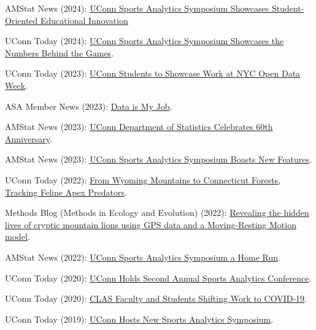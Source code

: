 \documentclass[Statistics]{vita}
\begin{document}
\begin{vita}
\begin{Services}
  \begin{Media}
  \item AMStat News (2024): \href{https://magazine.amstat.org/blog/2024/11/05/uconn-ucsas-2024/}{UConn Sports Analytics Symposium Showcases Student-Oriented Educational Innovation}
  \item UConn Today (2024): \href{https://today.uconn.edu/2024/04/uconn-sports-analytics-symposium-returns-for-fifth-time/}{UConn Sports Analytics Symposium Showcases the Numbers Behind the Games}.
  \item UConn Today (2023): \href{https://today.uconn.edu/2023/03/uconn-students-to-showcase-work-at-nyc-open-data-week/}{UConn Students to Showcase Work at NYC Open Data Week}.
  \item ASA Member News (2023): \href{https://www.amstat.org/docs/default-source/amstat-documents/data-is-my-job-poster.pdf}{Data is My Job}.
  \item AMStat News (2023): \href{https://magazine.amstat.org/blog/2023/02/01/uconn-stats-dept-anniversary/}{UConn Department of Statistics Celebrates 60th Anniversary}.
  \item AMStat News (2023): \href{https://magazine.amstat.org/blog/2023/01/02/uconn-sports-analytics-symposium/}{UConn Sports Analytics Symposium Boasts New Features}.
  \item UConn Today (2022): \href{https://today.uconn.edu/2022/10/from-wyoming-mountains-to-connecticut-forests-tracking-feline-apex-predators/}{From Wyoming Mountains to Connecticut Forests, Tracking Feline Apex Predators}.
  \item Methods Blog (Methods in Ecology and Evolution) (2022): \href{https://methodsblog.com/2022/01/21/revealing-the-hidden-lives-of-cryptic-mountain-lions-using-gps-data-and-a-moving-resting-motion-model/}{Revealing the hidden lives of cryptic mountain lions using GPS data and a Moving-Resting Motion model}.
  \item AMStat News (2022): \href{https://magazine.amstat.org/blog/2022/01/01/uconn-sports-analytics/}{UConn Sports Analytics Symposium a Home Run}.
  \item UConn Today (2020): \href{https://today.uconn.edu/2020/10/uconn-holds-second-annual-sports-analytics-conference/}{UConn Holds Second Annual Sports Analytics Conference}.
  \item UConn Today (2020):
\href{https://today.uconn.edu/2020/04/clas-faculty-students-shifting-work-covid-19/}{CLAS Faculty and Students Shifting Work to COVID-19}.
  \item UConn Today (2019): \href{https://today.uconn.edu/school-stories/uconn-hosts-new-sports-analytics-symposium/}{UConn Hosts New Sports Analytics Symposium}.

\end{Media}
\end{Services}
\end{vita}
\end{document}

